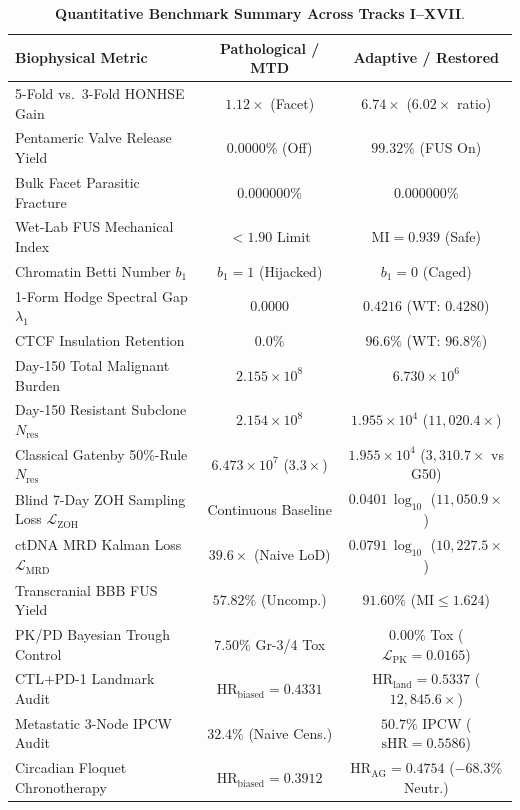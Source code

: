 \documentclass[aps,prx,twocolumn,superscriptaddress,longbibliography,nofootinbib]{revtex4-2}
\begin{document}
\begin{table}[htbp]
\centering
\small
\caption{\textbf{Quantitative Benchmark Summary Across Tracks I--XVII}.}
\label{tab:oncology_benchmarks}
\begin{tabular}{lcc}
\toprule
\textbf{Biophysical Metric} & \textbf{Pathological / MTD} & \textbf{Adaptive / Restored} \\
\midrule
5-Fold vs.\ 3-Fold HONHSE Gain & $1.12\times$ (Facet) & $6.74\times$ ($6.02\times$ ratio) \\
Pentameric Valve Release Yield & $0.0000\%$ (Off) & $99.32\%$ (FUS On) \\
Bulk Facet Parasitic Fracture & $0.000000\%$ & $0.000000\%$ \\
Wet-Lab FUS Mechanical Index & $< 1.90$ Limit & $\mathrm{MI} = 0.939$ (Safe) \\
Chromatin Betti Number $b_1$ & $b_1 = 1$ (Hijacked) & $b_1 = 0$ (Caged) \\
1-Form Hodge Spectral Gap $\lambda_1$ & $0.0000$ & $0.4216$ (WT: $0.4280$) \\
CTCF Insulation Retention & $0.0\%$ & $96.6\%$ (WT: $96.8\%$) \\
Day-150 Total Malignant Burden & $2.155 \times 10^8$ & $6.730 \times 10^6$ \\
Day-150 Resistant Subclone $N_{\mathrm{res}}$ & $2.154 \times 10^8$ & $1.955 \times 10^4$ ($11,020.4\times$) \\
Classical Gatenby 50\%-Rule $N_{\mathrm{res}}$ & $6.473 \times 10^7$ ($3.3\times$) & $1.955 \times 10^4$ ($3,310.7\times$ vs G50) \\
Blind 7-Day ZOH Sampling Loss $\mathcal{L}_{\mathrm{ZOH}}$ & Continuous Baseline & $0.0401\,\log_{10}$ ($11,050.9\times$) \\
ctDNA MRD Kalman Loss $\mathcal{L}_{\mathrm{MRD}}$ & $39.6\times$ (Naive LoD) & $0.0791\,\log_{10}$ ($10,227.5\times$) \\
Transcranial BBB FUS Yield & $57.82\%$ (Uncomp.) & $91.60\%$ ($\mathrm{MI} \le 1.624$) \\
PK/PD Bayesian Trough Control & $7.50\%$ Gr-3/4 Tox & $0.00\%$ Tox ($\mathcal{L}_{\mathrm{PK}}=0.0165$) \\
CTL+PD-1 Landmark Audit & $\mathrm{HR}_{\mathrm{biased}}=0.4331$ & $\mathrm{HR}_{\mathrm{land}}=0.5337$ ($12,845.6\times$) \\
Metastatic 3-Node IPCW Audit & $32.4\%$ (Naive Cens.) & $50.7\%$ IPCW ($\mathrm{sHR}=0.5586$) \\
Circadian Floquet Chronotherapy & $\mathrm{HR}_{\mathrm{biased}}=0.3912$ & $\mathrm{HR}_{\mathrm{AG}}=0.4754$ ($-68.3\%$ Neutr.) \\

\end{tabular}
\end{table}
\end{document}

